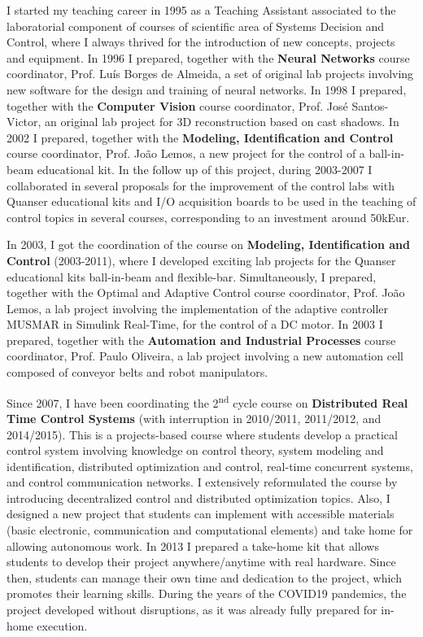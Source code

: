 \documentclass[
]{article}
\begin{document}
I started my teaching career in 1995 as a Teaching Assistant associated
to the laboratorial component of courses of scientific area of Systems
Decision and Control, where I always thrived for the introduction of new
concepts, projects and equipment. In 1996 I prepared, together with the
\textbf{Neural Networks} course coordinator, Prof. Luís Borges de
Almeida, a set of original lab projects involving new software for the
design and training of neural networks. In 1998 I prepared, together
with the \textbf{Computer Vision} course coordinator, Prof. José
Santos-Victor, an original lab project for 3D reconstruction based on
cast shadows. In 2002 I prepared, together with the \textbf{Modeling,
Identification and Control} course coordinator, Prof. João Lemos, a new
project for the control of a ball-in-beam educational kit. In the follow
up of this project, during 2003-2007 I collaborated in several proposals
for the improvement of the control labs with Quanser educational kits
and I/O acquisition boards to be used in the teaching of control topics
in several courses, corresponding to an investment around 50kEur.

In 2003, I got the coordination of the course on \textbf{Modeling,
Identification and Control} (2003-2011), where I developed exciting lab
projects for the Quanser educational kits ball-in-beam and flexible-bar.
Simultaneously, I prepared, together with the Optimal and Adaptive
Control course coordinator, Prof. João Lemos, a lab project involving
the implementation of the adaptive controller MUSMAR in Simulink
Real-Time, for the control of a DC motor. In 2003 I prepared, together
with the \textbf{Automation and Industrial Processes} course
coordinator, Prof. Paulo Oliveira, a lab project involving a new
automation cell composed of conveyor belts and robot manipulators.

Since 2007, I have been coordinating the 2\textsuperscript{nd} cycle
course on \textbf{Distributed Real Time Control Systems} (with
interruption in 2010/2011, 2011/2012, and 2014/2015). This is a
projects-based course where students develop a practical control system
involving knowledge on control theory, system modeling and
identification, distributed optimization and control, real-time
concurrent systems, and control communication networks. I extensively
reformulated the course by introducing decentralized control and
distributed optimization topics. Also, I designed a new project that
students can implement with accessible materials (basic electronic,
communication and computational elements) and take home for allowing
autonomous work. In 2013 I prepared a take-home kit that allows students
to develop their project anywhere/anytime with real hardware. Since
then, students can manage their own time and dedication to the project,
which promotes their learning skills. During the years of the COVID19
pandemics, the project developed without disruptions, as it was already
fully prepared for in-home execution.
\end{document}
